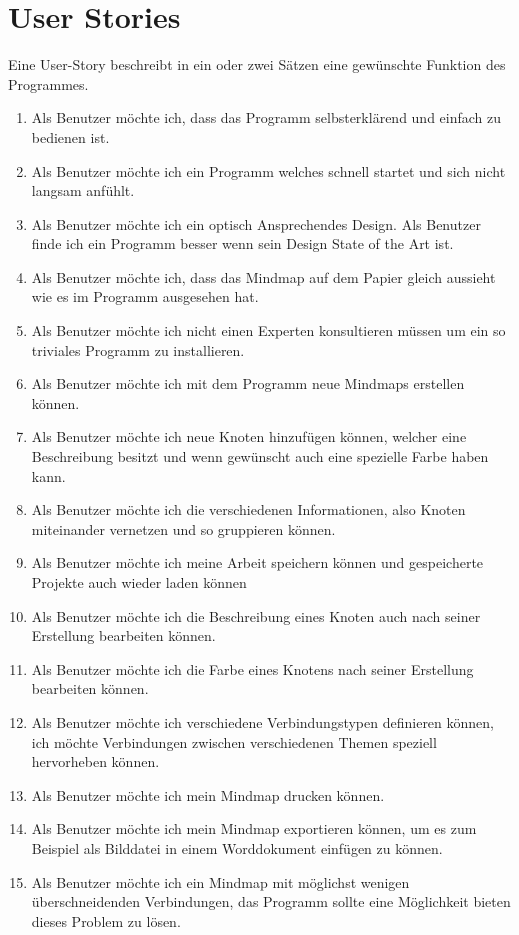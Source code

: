 \section{User Stories}
\label{sec:user_stories}
Eine User-Story beschreibt in ein oder zwei Sätzen eine gewünschte Funktion des Programmes.
\begin{enumerate}
\item Als Benutzer möchte ich, dass das Programm selbsterklärend und einfach zu bedienen ist.
\item Als Benutzer möchte ich ein Programm welches schnell startet und sich nicht langsam anfühlt.
\item Als Benutzer möchte ich ein optisch Ansprechendes Design. Als Benutzer finde ich ein Programm
besser wenn sein Design State of the Art ist.
\item Als Benutzer möchte ich, dass das Mindmap auf dem Papier gleich aussieht wie es im Programm ausgesehen hat.
\item Als Benutzer möchte ich nicht einen Experten konsultieren müssen um ein so triviales Programm zu installieren. 
\item Als Benutzer möchte ich mit dem Programm neue Mindmaps erstellen können.
\item Als Benutzer möchte ich neue Knoten hinzufügen können, welcher eine Beschreibung besitzt und wenn gewünscht auch eine spezielle Farbe haben kann. 
\item Als Benutzer möchte ich die verschiedenen Informationen, also Knoten miteinander vernetzen und so gruppieren können. 
\item Als Benutzer möchte ich meine Arbeit speichern können und gespeicherte Projekte auch wieder laden können
\item Als Benutzer möchte ich die Beschreibung eines Knoten auch nach seiner Erstellung bearbeiten können.
\item Als Benutzer möchte ich die Farbe eines Knotens nach seiner Erstellung bearbeiten können.
\item Als Benutzer möchte ich verschiedene Verbindungstypen definieren können, ich möchte Verbindungen zwischen verschiedenen Themen speziell hervorheben können. 
\item Als Benutzer möchte ich mein Mindmap drucken können.
\item Als Benutzer möchte ich mein Mindmap exportieren können, um es zum Beispiel als Bilddatei in einem Worddokument einfügen zu können.
\item Als Benutzer möchte ich ein Mindmap mit möglichst wenigen überschneidenden Verbindungen, das Programm sollte eine Möglichkeit bieten dieses Problem zu lösen.
\end{enumerate}

